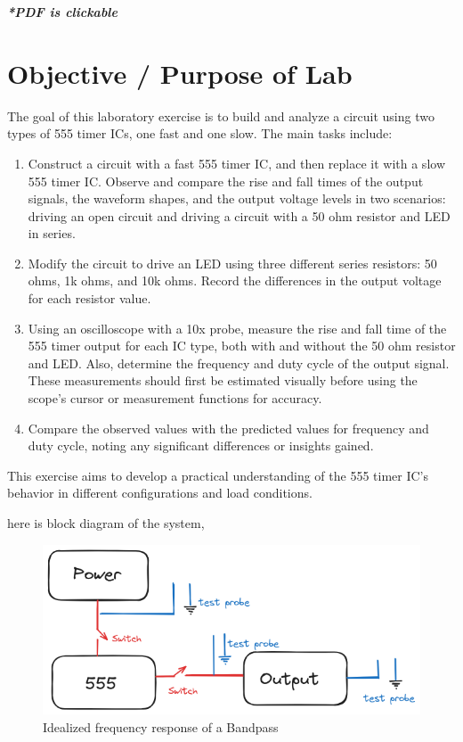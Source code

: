 \documentclass[a4paper,11pt]{article}%
\begin{document}


\pagebreak

\tableofcontents
\listoffigures
\listoftables
\vfill
\begin{center}
	\textbf{\textit{*PDF is clickable}}
\end{center}

\pagebreak

\section{Objective / Purpose of Lab}

The goal of this laboratory exercise is to build and analyze a circuit using two types of 555 timer ICs, one fast and one slow. The main tasks include:

\begin{enumerate}
	\item Construct a circuit with a fast 555 timer IC, and then replace it with a slow 555 timer IC. Observe and compare the rise and fall times of the output signals, the waveform shapes, and the output voltage levels in two scenarios: driving an open circuit and driving a circuit with a 50 ohm resistor and LED in series.
	\item Modify the circuit to drive an LED using three different series resistors: 50 ohms, 1k ohms, and 10k ohms. Record the differences in the output voltage for each resistor value.
	\item Using an oscilloscope with a 10x probe, measure the rise and fall time of the 555 timer output for each IC type, both with and without the 50 ohm resistor and LED. Also, determine the frequency and duty cycle of the output signal. These measurements should first be estimated visually before using the scope’s cursor or measurement functions for accuracy.
	\item Compare the observed values with the predicted values for frequency and duty cycle, noting any significant differences or insights gained.
\end{enumerate}


This exercise aims to develop a practical understanding of the 555 timer IC's behavior in different configurations and load conditions.

here is block diagram of the system,

\begin{figure}[!h]
	\centering
	\includegraphics[scale=0.4]{figures/ne555_blockdiagram}
	\caption{Idealized frequency response of a Bandpass}
	\label{idealbpfilter}
\end{figure}
\pagebreak
\end{document}
